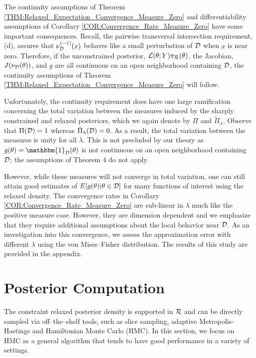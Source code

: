 \documentclass[10pt,fleqn]{article}
\DeclareMathOperator{\1}{\mathbbm{1}} \DeclareMathOperator{\bigO}{\mc O}
\begin{document}
The continuity assumptions of Theorem \ref{THM:Relaxed_Expectation_Convergence_Measure_Zero} and differentiability assumptions of Corollary \ref{COR:Convergence_Rate_Measure_Zero} have some important consequences.  Recall, the pairwise transversal intersection requirement, (d), assures that $\nu_{\mathcal{D}}^{(-1)}(x)$ behaves like a small perturbation of $\mathcal{D}$ when $x$ is near zero. Therefore, if the unconstrained posterior, $\mathcal{L}(\theta;Y)\pi_{\mathcal{R}}(\theta)$, the Jacobian, $J(\nu_{\mathcal{D}}(\theta))$, and $g$ are all continuous on an open neighborhood containing $\mathcal{D}$, the continuity assumptions of Theorem \ref{THM:Relaxed_Expectation_Convergence_Measure_Zero} will follow.

Unfortunately, the continuity requirement does have one large ramification concerning the total variation between the measures induced by the sharply constrained and relaxed posteriors, which we again denote by $\Pi$ and $\tilde{\Pi}_{\lambda}$. Observe that $\Pi(\mathcal{D}) = 1$ whereas $\tilde{\Pi}_\lambda(\mathcal{D}) = 0$. As a result, the total variation between the measures is unity for all $\lambda$. This is not precluded by our theory as $g(\theta)=\mathbbm{1}_{\mc D}(\theta)$ is not continuous on an open neighborhood containing $\mathcal{D}$; the assumptions of Theorem 4 do not apply.  

However, while these measures will not converge in total variation, one can still attain good estimates of $E[g(\theta)|\theta\in\mathcal{D}]$ for many functions of interest using the relaxed density.
The convergence rates in Corollary \ref{COR:Convergence_Rate_Measure_Zero} are sub-linear in $\lambda$ much like the positive measure case. However, they are dimension dependent and we emphasize that they require additional assumptions about the local behavior near $\mathcal{D}$. As an investigation into this convergence, we assess the approximation error with different $\lambda$ using the von Mises--Fisher distribution. The results of this study are provided in the appendix. 


\section{Posterior Computation}

The constraint relaxed posterior density is supported in $\mathcal{R}$ and can be directly
sampled via off--the--shelf tools, such as slice
sampling, adaptive Metropolis-Hastings and Hamiltonian Monte Carlo (HMC).
In this section, we focus on HMC as a general algorithm that tends to have good 
performance in a variety of settings.
\end{document}
